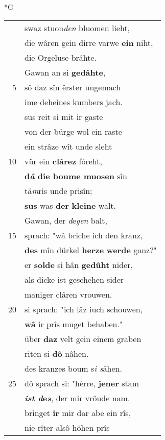 \documentclass[8pt,a4paper,notitlepage]{article}
\begin{document}
\begin{table}[ht]
\begin{minipage}[t]{0.5\linewidth}
\small
\begin{center}*G
\end{center}
\begin{tabular}{rl}
 & swaz stuon\textit{den} bluomen lieht,\\ 
 & die wâren gein dirre varwe \textbf{ein} niht,\\ 
 & die Orgeluse brâhte.\\ 
 & Gawan an si \textbf{gedâhte},\\ 
5 & sô daz sîn êrster ungemach\\ 
 & ime deheines kumbers jach.\\ 
 & sus reit si mit ir gaste\\ 
 & von der bürge wol ein raste\\ 
 & ein strâze wît unde sleht\\ 
10 & vür ein \textbf{clârez} fôreht,\\ 
 & \textbf{d\textit{â} die boume muosen} sîn\\ 
 & tä\textit{m}ris unde prisîn;\\ 
 & \textbf{sus} was \textbf{der} \textbf{kleine} walt.\\ 
 & Gawan, der \textit{d}e\textit{gen} balt,\\ 
15 & sprach: "wâ briche ich den kranz,\\ 
 & \textbf{des} mîn dürkel \textbf{herze} \textbf{werde} ganz?"\\ 
 & er \textbf{solde} si hân \textbf{gedûht} nider,\\ 
 & als dicke ist geschehen sider\\ 
 & maniger clâren vrouwen.\\ 
20 & si sprach: "ich lâz iuch schouwen,\\ 
 & \textbf{wâ} ir prîs muget behaben."\\ 
 & über \textbf{daz} velt gein einem graben\\ 
 & riten si \textbf{dô} nâhen.\\ 
 & des kranzes boum s\textit{i s}âhen.\\ 
25 & dô sprach si: "hêrre, \textbf{jener} stam\\ 
 & \textbf{\textit{ist d}e\textit{s}}, der mir vröude nam.\\ 
 & bringet \textbf{ir} mir dar abe ein rîs,\\ 
 & nie rîter alsô hôhen prîs\\ 

\end{tabular}
\end{minipage}
\end{table}
\end{document}
